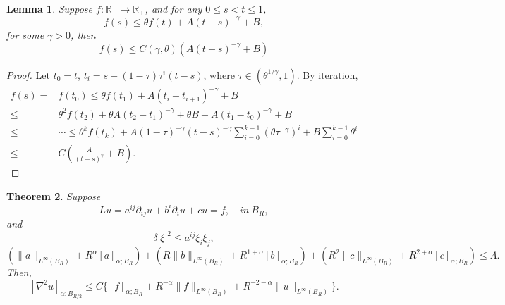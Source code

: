\documentclass[twoside, 12pt]{book}
\numberwithin{equation}{chapter}
\newtheorem{theorem}{Theorem}[section]
\newtheorem{lemma}[theorem]{Lemma}
\def\mR{{\mathbb R}}
\def\leq{\leqslant}
\def\p{\partial}
\begin{document}
	\begin{lemma}\label{Le-Ele}
		Suppose $f: \mR_+ \to\mR_+$, and for any $0\leq s<t\leq 1$, 
		$$
		f(s)\leq \theta f(t)+ A(t-s)^{-\gamma} +B, 
		$$ 
		for some $\gamma>0$, then 
		\begin{equation}
			f(s)\leq C(\gamma, \theta) \left( A (t-s)^{-\gamma} +B\right)
		\end{equation}
	\end{lemma}
	\begin{proof}
		Let $t_0=t$, $t_i=s+(1-\tau)\tau^i (t-s)$, where $\tau\in (\theta^{1/\gamma},1)$. By iteration, 
		\begin{align*}
			f(s)=& f(t_{0})\leq \theta f(t_{1})+ A(t_{i}-t_{i+1})^{-\gamma}+B\\
			\leq & \theta^2 f(t_{2})+\theta A(t_{2}-t_1)^{-\gamma}+\theta B+A(t_{1}-t_{0})^{-\gamma}+B\\
			\leq&  \cdots \leq \theta^k f(t_k)+ A (1-\tau)^{-\gamma} (t-s)^{-\gamma} \sum_{i=0}^{k-1} (\theta \tau^{-\gamma})^i +B\sum_{i=0}^{k-1} \theta^i\\
			\leq &C\left(\frac{A}{(t-s)^\gamma}+B\right). 
		\end{align*}
		
	\end{proof}
	\begin{theorem}
		Suppose 
		\begin{equation}\label{Eq-2}
			Lu =a^{ij}\p_{ij} u+b^i \p_i u+cu=f, \quad \textit{in}\ B_R, 
		\end{equation}
		and 
		\begin{equation}
			\delta |\xi|^2\leq a^{ij}\xi_i\xi_j, 
		\end{equation}
		\begin{equation}
			(\|a\|_{L^\infty(B_R)}+ R^\alpha [a]_{\alpha; B_R})+(R\|b\|_{L^\infty(B_R)}+ R^{1+\alpha} [b]_{\alpha; B_R})+(R^2\|c\|_{L^\infty(B_R)}+ R^{2+\alpha} [c]_{\alpha; B_R}) \leq \Lambda. 
		\end{equation}
		Then, 
		$$
		[\nabla^2 u]_{\alpha; B_{R/2}}\leq C \Big\{ [f]_{\alpha;B_R} +R^{-\alpha}\|f\|_{L^\infty(B_R)}+R^{-2-\alpha} \|u\|_{L^\infty(B_R)} \Big\}. 
		$$
	\end{theorem}
\end{document}
